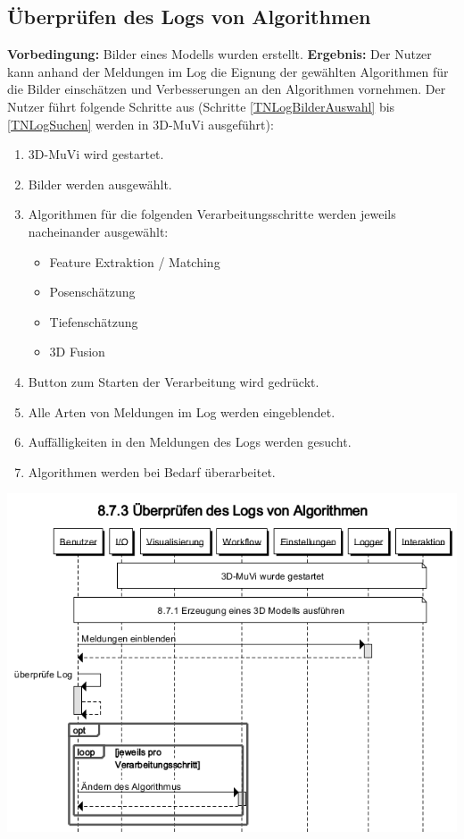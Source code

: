 \subsection{Überprüfen des Logs von Algorithmen}
\textbf{Vorbedingung:} Bilder eines Modells wurden erstellt. \newline
\textbf{Ergebnis:} Der Nutzer kann anhand der Meldungen im Log die Eignung der gewählten Algorithmen für die Bilder einschätzen und Verbesserungen an den Algorithmen vornehmen. \newline
Der Nutzer führt folgende Schritte aus (Schritte \ref{TNLogBilderAuswahl} bis \ref{TNLogSuchen} werden in 3D-MuVi ausgeführt):
\begin{enumerate}
	\item 3D-MuVi wird gestartet.
	\item \label{TNLogBilderAuswahl} Bilder werden ausgewählt.
	\item Algorithmen für die folgenden Verarbeitungsschritte werden jeweils nacheinander ausgewählt:
	\begin{itemize}
		\item Feature Extraktion / Matching
		\item Posenschätzung
		\item Tiefenschätzung
		\item 3D Fusion
	\end{itemize}
	\item Button zum Starten der Verarbeitung wird gedrückt.
	\item Alle Arten von Meldungen im Log werden eingeblendet.
	\item \label{TNLogSuchen} Auffälligkeiten in den Meldungen des Logs werden gesucht.
	\item Algorithmen werden bei Bedarf überarbeitet.
\end{enumerate}
\includegraphics[width=1.05\textwidth]{img/873_Seqz.png}

